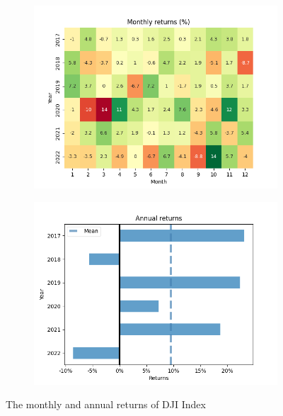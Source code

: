 \documentclass[../xlapes02]{subfiles}
\begin{document}
    \begin{figure}[H]
        \centering
        \begin{subfigure}[t]{\experimentimgwidth\textwidth}
            \centering
            \includegraphics[width=\linewidth]{image/figure/monthly_returns_heatmap_dji}
        \end{subfigure}
        \hfill
        \begin{subfigure}[t]{\experimentimgwidth\textwidth}
            \centering
            \includegraphics[width=\linewidth]{image/figure/annual_returns_dji}
        \end{subfigure}
        \caption{The monthly and annual returns of DJI Index}
        \label{fig:month_annual_returns_dji}
    \end{figure}
\end{document}
